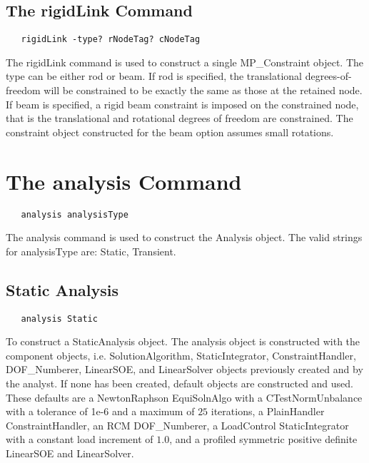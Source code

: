 \documentclass[12pt]{article}
\begin{document}
\subsection{The rigidLink Command}
{\sf\small
\begin{verbatim}
   rigidLink -type? rNodeTag? cNodeTag
\end{verbatim}
}

The rigidLink command is used to construct a single MP\_Constraint object.
The type can be either rod or beam. If rod is specified, the
translational degrees-of-freedom will be constrained to be exactly the
same as those at the retained node. If beam is specified, a rigid beam
constraint is imposed on the constrained node, that is the translational and
rotational degrees of freedom are constrained. The constraint object
constructed for the beam option assumes small rotations.

\section {The analysis Command}

{\sf\small
\begin{verbatim}
   analysis analysisType 
\end{verbatim}
}

The analysis command is used to construct the Analysis object.
The valid strings for analysisType are: Static, Transient. 

\subsection{Static Analysis}

{\sf\small
\begin{verbatim}
   analysis Static 
\end{verbatim}
}

To construct a StaticAnalysis object. The analysis object is
constructed with the component objects, i.e. SolutionAlgorithm, StaticIntegrator,
ConstraintHandler, DOF\_Numberer, LinearSOE, and LinearSolver objects
previously created and by the analyst. If none has been created,
default objects are constructed and used. These defaults are a
NewtonRaphson EquiSolnAlgo with a CTestNormUnbalance with a tolerance
of 1e-6 and a maximum of $25$ iterations, a PlainHandler
ConstraintHandler, an RCM DOF\_Numberer, a LoadControl
StaticIntegrator with a constant load increment of $1.0$, and a
profiled symmetric positive definite LinearSOE and LinearSolver.
\end{document}
